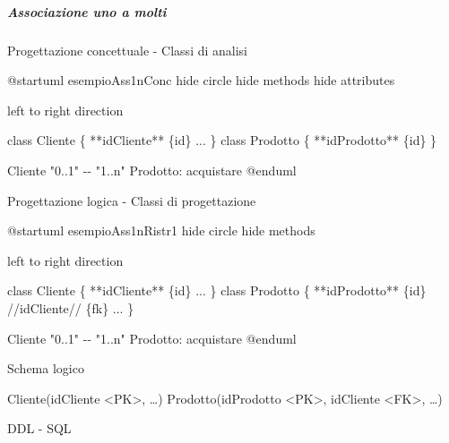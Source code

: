 \documentclass[
]{article}
\newenvironment{Shaded}{}{}
\newcommand{\NormalTok}[1]{#1}
\begin{document}
\subparagraph{Associazione uno a molti}\label{associazione-uno-a-molti}

Progettazione concettuale - Classi di analisi

\begin{Shaded}
\begin{Highlighting}[]
\NormalTok{@startuml esempioAss1nConc}
\NormalTok{hide circle}
\NormalTok{hide methods}
\NormalTok{hide attributes}

\NormalTok{left to right direction}

\NormalTok{class Cliente \{}
\NormalTok{  **idCliente** \{id\}}
\NormalTok{  ...}
\NormalTok{\}}
\NormalTok{class Prodotto \{}
\NormalTok{  **idProdotto** \{id\}}
\NormalTok{\}}

\NormalTok{Cliente "0..1" {-}{-} "1..n" Prodotto: acquistare}
\NormalTok{@enduml}
\end{Highlighting}
\end{Shaded}



Progettazione logica - Classi di progettazione

\begin{Shaded}
\begin{Highlighting}[]
\NormalTok{@startuml esempioAss1nRistr1}
\NormalTok{hide circle}
\NormalTok{hide methods}

\NormalTok{left to right direction}

\NormalTok{class Cliente \{}
\NormalTok{  **idCliente** \{id\}}
\NormalTok{  ...}
\NormalTok{\}}
\NormalTok{class Prodotto \{}
\NormalTok{  **idProdotto** \{id\}}
\NormalTok{  //idCliente// \{fk\}}
\NormalTok{  ...}
\NormalTok{\}}

\NormalTok{Cliente "0..1" {-}{-} "1..n" Prodotto: acquistare}
\NormalTok{@enduml}
\end{Highlighting}
\end{Shaded}



Schema logico

\begin{Shaded}
\begin{Highlighting}[]
\NormalTok{Cliente(idCliente \textless{}PK\textgreater{}, …)}
\NormalTok{Prodotto(idProdotto \textless{}PK\textgreater{}, idCliente \textless{}FK\textgreater{}, …)}
\end{Highlighting}
\end{Shaded}

DDL - SQL
\end{document}
